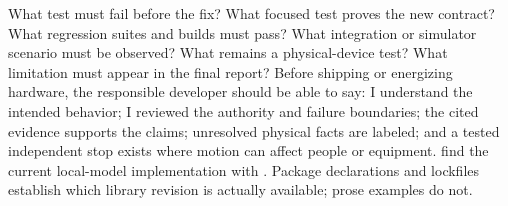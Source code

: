\markdownRendererUlEnd \markdownRendererInterblockSeparator
{}
\markdownRendererSectionEnd \markdownRendererSectionBegin
{}\markdownRendererInterblockSeparator
{}\markdownRendererUlBegin
\markdownRendererUlItem What test must fail before the fix?\markdownRendererUlItemEnd 
\markdownRendererUlItem What focused test proves the new contract?\markdownRendererUlItemEnd 
\markdownRendererUlItem What regression suites and builds must pass?\markdownRendererUlItemEnd 
\markdownRendererUlItem What integration or simulator scenario must be observed?\markdownRendererUlItemEnd 
\markdownRendererUlItem What remains a physical-device test?\markdownRendererUlItemEnd 
\markdownRendererUlItem What limitation must appear in the final report?\markdownRendererUlItemEnd 
\markdownRendererUlEnd \markdownRendererInterblockSeparator
{}
\markdownRendererSectionEnd \markdownRendererSectionBegin
{}\markdownRendererInterblockSeparator
{}\markdownRendererInterblockSeparator
{}
\markdownRendererSectionEnd \markdownRendererSectionBegin
{}\markdownRendererInterblockSeparator
{}Before shipping or energizing hardware, the responsible developer should be\markdownRendererSoftLineBreak
{}able to say: I understand the intended behavior; I reviewed the authority and\markdownRendererSoftLineBreak
{}failure boundaries; the cited evidence supports the claims; unresolved\markdownRendererSoftLineBreak
{}physical facts are labeled; and a tested independent stop exists where motion\markdownRendererSoftLineBreak
{}can affect people or equipment.\markdownRendererInterblockSeparator
{}\markdownRendererThematicBreak{}\markdownRendererInterblockSeparator
{}
\markdownRendererSectionEnd 
\markdownRendererSectionEnd \markdownRendererSectionBegin
{}\markdownRendererInterblockSeparator
{}\markdownRendererBlockQuoteBegin
{} find the current local-model implementation with . Package declarations and lockfiles establish which library revision is actually available; prose examples do not.\markdownRendererBlockQuoteEnd \markdownRendererInterblockSeparator

